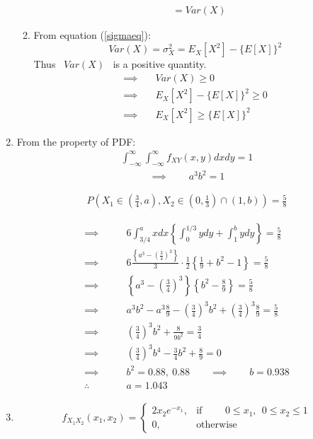 \documentclass[11pt]{article}
\begin{document}
\begin{enumerate}[1: ]
\begin{enumerate}[$(a)$ ]
\begin{align*}
		&=Var(X)
	\end{align*}
\item From equation (\ref{sigmaeq}):
	\begin{equation*}
		Var(X) = \sigma_X^2 = E_X[X^2] - \{ E[X]\}^2
	\end{equation*}
		Thus \ $Var(X)$ \ is a positive quantity.
	\begin{align*}
		\implies \quad & Var(X) \ge 0 \\
		\implies \quad & E_X[X^2] - \{ E[X]\}^2 \ge 0 \\
		\implies \quad & E_X[X^2] \ge \{ E[X]\}^2 
	\end{align*}
\end{enumerate}
\item From the property of PDF:
	\begin{align*}
	\int_{-\infty}^\infty \int_{-\infty}^\infty f_{XY}(x,y)dx dy = 1
	\end{align*}
	\begin{align}
	\implies \qquad a^3 b^2 = 1 
	\end{align}

	\begin{align}
		P(X_1 \in(\frac{3}{4},a),
		X_2 \in(0,\frac{1}{3}) \cap (1,b)) = \frac{5}{8}
	\end{align}

	\begin{align*}
	\implies \qquad & 6
		\int_{3/4}^a x dx \left\{ \int_{0}^{1/3} y dy 
			+\int_{1}^{b} y dy \right\} = \frac{5}{8} \\
	\implies \qquad & 6
		\frac{\left\{a^3-\left(\frac{3}{4}\right)^3\right\}}{3}
		\cdot\frac{1}{2} \left\{\frac{1}{9}+b^2-1 \right\} 
					= \frac{5}{8}	\\
	\implies \qquad & 
		\left\{a^3-\left(\frac{3}{4}\right)^3\right\}
		\left\{b^2-\frac{8}{9}\right\} = \frac{5}{8}	\\
	\implies \qquad & 
		a^3b^2-a^3\frac{8}{9}-\left(\frac{3}{4}\right)^3b^2
		+\left(\frac{3}{4}\right)^3 \frac{8}{9} = \frac{5}{8}	\\
	\implies \qquad & 
		\left(\frac{3}{4}\right)^3b^2 +\frac{8}{9b^2} = \frac{3}{4} \\
	\implies \qquad & 
		\left(\frac{3}{4}\right)^3b^4 -\frac{3}{4}b^2+\frac{8}{9}=0 \\
	\implies \qquad & 
		b^2 = 0.88, \ 0.88 \qquad \implies \qquad b=0.938 \\
	\therefore \qquad & 
		a = 1.043
	\end{align*}
\item 
	\begin{align*}
	f_{X_1X_2}(x_1,x_2) = 
	\begin{cases}
	     2x_2 e^{-x_1}, & \text{if }\qquad 0\le x_1, \ \ 0 \le x_2 \le 1 \\
		0, & \text{otherwise}
	\end{cases}
	\end{align*}


\end{enumerate}
\end{document}

